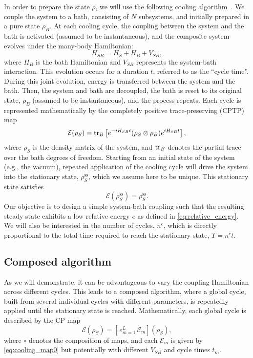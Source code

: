 \documentclass[aps,prx,twocolumn,superscriptaddress,nofootinbib,nolongbibliography,nobalancelastpage,10pt,floatfix]{revtex4-2}
\begin{document}
In order to prepare the state $\rho$, we will use the following cooling algorithm~\cite{Terhal2000Problem}. We couple the system to a bath, consisting of $N$ subsystems, and initially prepared in a pure state $\rho_B$. At each cooling cycle, the coupling between the system and the bath is activated (assumed to be instantaneous), and the composite system evolves under the many-body Hamiltonian:
\begin{equation}
    H_{SB} = H_S + H_B + V_{SB},
    \label{eq:HSB}
\end{equation}
where $H_B$ is the bath Hamiltonian and $V_{SB}$ represents the system-bath interaction. This evolution occurs for a duration $t$, referred to as the ``cycle time''. During this joint evolution, energy is transferred between the system and the bath. Then, the system and bath are decoupled, the bath is reset to its original state, $\rho_B$ (assumed to be instantaneous), and the process repeats. Each cycle is represented mathematically by the completely positive trace-preserving (CPTP) map
\begin{equation}
    \mathcal{E}(\rho_S) = \operatorname{tr}_B\left[e^{-i H_{SB}t}(\rho_S \otimes \rho_B)e^{i H_{SB}t}\right],
    \label{eq:cooling_map0}
\end{equation}
where $\rho_S$ is the density matrix of the system, and $\operatorname{tr}_B$ denotes the partial trace over the bath degrees of freedom. Starting from an initial state of the system (e.g., the vacuum), repeated application of the cooling cycle will drive the system into the stationary state, $\rho_{S}^\text{ss}$, which we assume here to be unique. This stationary state satisfies
\begin{equation}
    \mathcal{E}(\rho_{S}^\text{ss}) = \rho_{S}^\text{ss}.
\end{equation}
Our objective is to design a simple system-bath coupling such that the resulting steady state exhibits a low relative energy $e$ as defined in \cref{eq:relative_energy}. We will also be interested in the number of cycles, $n^c$, which is directly proportional to the total time required to reach the stationary state, $T=n^c t$.

\subsection{Composed algorithm}
\label{subsec:composed_alg}
As we will demonstrate, it can be advantageous to vary the coupling Hamiltonian across different cycles. This leads to a composed algorithm, where a global cycle, built from several individual cycles with different parameters, is repeatedly applied until the stationary state is reached. Mathematically, each global cycle is described by the CP map
\begin{equation}
    \mathcal{E}(\rho_S) = \left[\circ_{m=1}^L \mathcal{E}_m\right](\rho_S),
    \label{eq:cooling_map2}
\end{equation}
where $\circ$ denotes the composition of maps, and each $\mathcal{E}_m$ is given by \cref{eq:cooling_map0} but potentially with different $V_{SB}$ and cycle times $t_m$.
\end{document}
